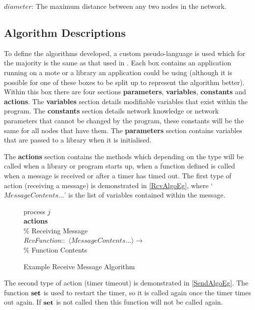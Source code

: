 \begin{mydef}
\emph{$diameter$}: The maximum distance between any two nodes in the network.
\end{mydef}

\subsection{Algorithm Descriptions}

To define the algorithms developed, a custom pseudo-language is used which for the majority is the same as that used in \cite{MBCS310}. Each box contains an application running on a mote or a library an application could be using (although it is possible for one of these boxes to be split up to represent the algorithm better). Within this box there are four sections \textbf{parameters}, \textbf{variables}, \textbf{constants} and \textbf{actions}. The \textbf{variables} section details modifiable variables that exist within the program. The \textbf{constants} section details network knowledge or network parameters that cannot be changed by the program, these constants will be the same for all nodes that have them. The \textbf{parameters} section contains variables that are passed to a library when it is initialised.

The \textbf{actions} section contains the methods which depending on the type will be called when a library or program starts up, when a function defined is called when a message is received or after a timer has timed out. The first type of action (receiving a message) is demonstrated in \autoref{RcvAlgoEg}, where `$MessageContents...$' is the list of variables contained within the message.

\begin{figure}[H]
  \centering
  \begin{boxedminipage}{\linewidth}
    \null process $j$\\
    \null \textbf{actions}\\
    \null\qq \% Receiving Message\\
    \null\qq \emph{RcvFunction}::~$\langle MessageContents...\rangle \rightarrow$\\
    \null\qq\qq \% Function Contents\\
  \end{boxedminipage}
  \caption{Example Receive Message Algorithm}
  \label{RcvAlgoEg}
\end{figure}

The second type of action (timer timeout) is demonstrated in \autoref{SendAlgoEg}. The function $\mbox{\textbf{set}}$ is used to restart the timer, so it is called again once the timer times out again. If $\mbox{\textbf{set}}$ is not called then this function will not be called again.

